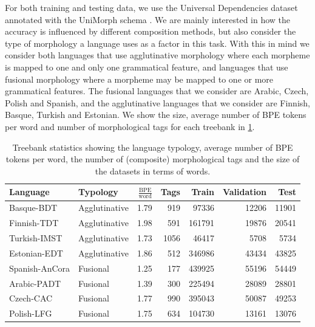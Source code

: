 \documentclass[11pt]{article}
\newcommand\citep{\cite}
\begin{document}
            For both training and testing data, we use the Universal
     Dependencies dataset \citep{nivre2018} annotated with the
     UniMorph schema \citep{mccarthy2018marrying}.  We are mainly
     interested in how the accuracy is influenced by different
     composition methods, but also consider the type of morphology a
     language uses as a factor in this task.
%
    With this in mind we consider both
     languages that use agglutinative morphology where each morpheme
     is mapped to one and only one grammatical feature, and
     languages that use fusional morphology where a morpheme may be
     mapped to one or more grammatical features. 
%
%
           	The fusional languages that we consider are Arabic, Czech,
     Polish and Spanish, and the agglutinative languages that we
     consider are Finnish, Basque, Turkish and Estonian.  We show the
     size, average number of BPE tokens per word and number of
     morphological tags for each treebank in \cref{tab:data}.
    
    
    \begin{table}
		\centering
		\begin{tabular}{l|lrrrrr}
			Language & Typology & $\frac{\textrm{BPE}}{\textrm{word}}$ & Tags & Train & Validation & Test \\
			\hline
			Basque-BDT      & Agglutinative & 1.79 & 919 & 97336 & 12206 & 11901 \\
			Finnish-TDT     & Agglutinative & 1.98 & 591 & 161791 & 19876 & 20541 \\
			Turkish-IMST    & Agglutinative & 1.73 & 1056 & 46417 & 5708 & 5734 \\
			Estonian-EDT    & Agglutinative & 1.86 & 512 & 346986 & 43434 & 43825 \\
    		Spanish-AnCora  & Fusional & 1.25 & 177 & 439925 & 55196 & 54449 \\ 
            Arabic-PADT     & Fusional & 1.39 & 300 & 225494 & 28089 & 28801  \\
			Czech-CAC       & Fusional & 1.77 & 990 & 395043 & 50087 & 49253 \\
			Polish-LFG      & Fusional & 1.75 & 634 & 104730 & 13161 & 13076 \\
        \end{tabular}
        \caption{\label{tab:data} Treebank statistics showing the
     language typology, average number of BPE tokens per word, the
     number of (composite) morphological tags and the size of the
     datasets in terms of words.}
	\end{table}
    
\end{document}
